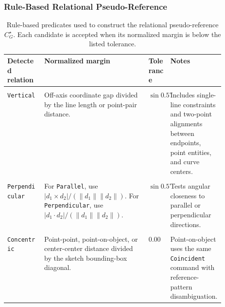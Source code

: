 \subsubsection{Rule-Based Relational Pseudo-Reference}
\label{sec:appendix_rl_pseudo_rules}

\begin{table}[t]
    \centering
    \footnotesize
    \setlength{\tabcolsep}{4pt}
    \caption{Rule-based predicates used to construct the relational pseudo-reference $C_G^\star$. Each candidate is accepted when its normalized margin is below the listed tolerance.}
    \label{tab:appendix_pseudo_rules}
    \begin{tabularx}{\linewidth}{@{}>{\raggedright\arraybackslash}p{0.17\linewidth}>{\raggedright\arraybackslash}X>{\raggedright\arraybackslash}p{0.10\linewidth}>{\raggedright\arraybackslash}p{0.25\linewidth}@{}}
        \toprule
        Detected relation & Normalized margin & Tolerance & Notes \\
        \midrule
        \begin{tabular}[t]{@{}l@{}}\texttt{Horizontal}\\\texttt{Vertical}\end{tabular}
        & Off-axis coordinate gap divided by the line length or point-pair distance.
        & $\sin 0.5^\circ$
        & Includes single-line constraints and two-point alignments between endpoints, point entities, and curve centers. \\

        \begin{tabular}[t]{@{}l@{}}\texttt{Parallel}\\\texttt{Perpendicular}\end{tabular}
        & For \texttt{Parallel}, use $|d_1 \times d_2|/(\|d_1\|\|d_2\|)$. For \texttt{Perpendicular}, use $|d_1\cdot d_2|/(\|d_1\|\|d_2\|)$.
        & $\sin 0.5^\circ$
        & Tests angular closeness to parallel or perpendicular directions. \\

        \begin{tabular}[t]{@{}l@{}}\texttt{Coincident}\\\texttt{Concentric}\end{tabular}
        & Point-point, point-on-object, or center-center distance divided by the sketch bounding-box diagonal.
        & $0.0025$
        & Point-on-object uses the same \texttt{Coincident} command with reference-pattern disambiguation. \\


\end{tabularx}
\end{table}

